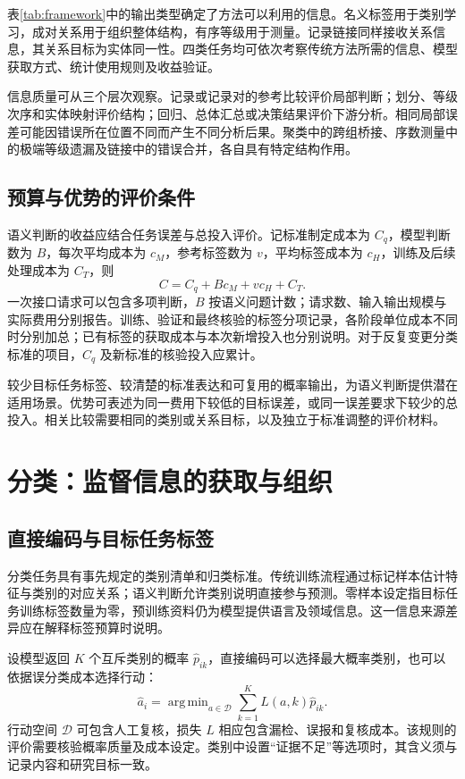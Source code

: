 \documentclass[UTF8,a4paper,zihao=-4,fontset=fandol]{ctexart}
\DeclareMathOperator*{\argmin}{arg\,min}
\begin{document}
表\ref{tab:framework}中的输出类型确定了方法可以利用的信息。名义标签用于类别学习，成对关系用于组织整体结构，有序等级用于测量。记录链接同样接收关系信息，其关系目标为实体同一性。四类任务均可依次考察传统方法所需的信息、模型获取方式、统计使用规则及收益验证。

信息质量可从三个层次观察。记录或记录对的参考比较评价局部判断；划分、等级次序和实体映射评价结构；回归、总体汇总或决策结果评价下游分析。相同局部误差可能因错误所在位置不同而产生不同分析后果。聚类中的跨组桥接、序数测量中的极端等级遗漏及链接中的错误合并，各自具有特定结构作用。

\subsection{预算与优势的评价条件}

语义判断的收益应结合任务误差与总投入评价。记标准制定成本为 $C_q$，模型判断数为 $B$，每次平均成本为 $c_M$，参考标签数为 $v$，平均标签成本为 $c_H$，训练及后续处理成本为 $C_T$，则
\begin{equation}
 C=C_q+B c_M+v c_H+C_T.
 \label{eq:cost}
\end{equation}
一次接口请求可以包含多项判断，$B$ 按语义问题计数；请求数、输入输出规模与实际费用分别报告。训练、验证和最终核验的标签分项记录，各阶段单位成本不同时分别加总；已有标签的获取成本与本次新增投入也分别说明。对于反复变更分类标准的项目，$C_q$ 及新标准的核验投入应累计。

较少目标任务标签、较清楚的标准表达和可复用的概率输出，为语义判断提供潜在适用场景。优势可表述为同一费用下较低的目标误差，或同一误差要求下较少的总投入。相关比较需要相同的类别或关系目标，以及独立于标准调整的评价材料。

\section{分类：监督信息的获取与组织}\label{sec:classification}

\subsection{直接编码与目标任务标签}

分类任务具有事先规定的类别清单和归类标准。传统训练流程通过标记样本估计特征与类别的对应关系；语义判断允许类别说明直接参与预测。零样本设定指目标任务训练标签数量为零，预训练资料仍为模型提供语言及领域信息\citep{yin2019}。这一信息来源差异应在解释标签预算时说明。

设模型返回 $K$ 个互斥类别的概率 $\widehat p_{ik}$，直接编码可以选择最大概率类别，也可以依据误分类成本选择行动：
\begin{equation}
 \widehat a_i=\argmin_{a\in\mathcal D}\sum_{k=1}^K L(a,k)\widehat p_{ik}.
 \label{eq:classification}
\end{equation}
行动空间 $\mathcal D$ 可包含人工复核，损失 $L$ 相应包含漏检、误报和复核成本。该规则的评价需要核验概率质量及成本设定。类别中设置“证据不足”等选项时，其含义须与记录内容和研究目标一致。
\end{document}
